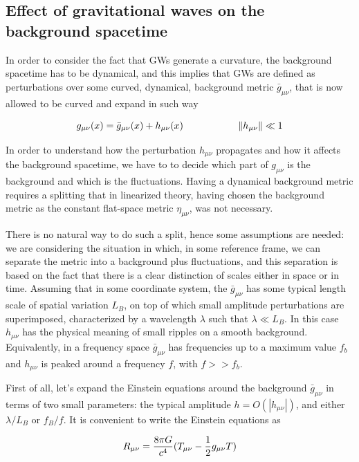 \documentclass[binding=0.6cm, LaM]{sapthesis}
\begin{document}
\subsection{Effect of gravitational waves on the background spacetime}

	In order to consider the fact that GWs generate a curvature, the background spacetime has to be dynamical, 
	and this implies that GWs are defined as perturbations over some curved, dynamical, 
	background metric $\bar g_{\mu \nu}$, that is now allowed to be curved and expand in such way

		\begin{equation}
		g_{\mu \nu}(x) = \bar g_{\mu \nu}(x) + h_{\mu \nu}(x) \hspace*{2cm}\|h_{\mu\nu}\|\ll 1
		\end{equation}

	In order to understand how the perturbation $h_{\mu \nu}$ propagates and how it affects the background spacetime, 
	we have to to decide which part of $g_{\mu\nu}$ is the background and which is the fluctuations. 
	Having a dynamical background metric requires a splitting that in linearized theory, 
	having chosen the background metric as the constant flat-space metric $\eta_{\mu\nu}$, was not necessary.

	There is no natural way to do such a split, hence some assumptions are needed: we are considering the situation in which, 
	in some reference frame, we can separate the metric into a background plus fluctuations, 
	and this separation is based on the fact that there is a clear distinction of scales either in space or in time.
	Assuming that in some coordinate system, the $\bar g_{\mu \nu}$ has some typical length scale of spatial variation $L_B$, 
	on top of which small amplitude perturbations are superimposed, characterized by a wavelength $\lambda$ such that $\lambda \ll L_B$. 
	In this case $h_{\mu\nu}$ has the physical meaning of small ripples on a smooth background.
	Equivalently, in a frequency space $\bar g_{\mu\nu}$ has frequencies up to a maximum value $f_b$ and  $h_{\mu\nu}$  
	is peaked around a frequency $f$, with $f >> f_b$.

	First of all, let's expand the Einstein equations around the background $\bar g_{\mu \nu}$ in terms of two small parameters: 
	the typical amplitude $h= O(|h_{\mu\nu}|)$, and either $\lambda/L_B$ or $f_B/f$.
	It is convenient to write the Einstein equations as

		\begin{equation}
		R_{\mu\nu} = {{8\pi G}\over c^4}(T_{\mu\nu}- {1 \over 2}g_{\mu\nu}T) 
		\end{equation}
\end{document}
